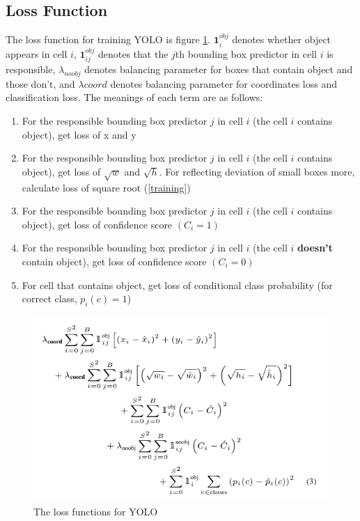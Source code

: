 \documentclass[extendedabs]{bmvc2k}
\begin{document}
\subsection{Loss Function}
The loss function for training YOLO is figure \ref{lossfunction}. $\mathbf{1}^{obj}_i$ denotes whether object appears in cell $i$, $\mathbf{1}^{obj}_{ij}$ denotes that the $j$th bounding box predictor in cell $i$ is responsible, $\lambda_{noobj} $ denotes balancing parameter for boxes that contain object and those don't, and $\lambda{coord}$ denotes balancing parameter for coordinates loss and classification loss. The meanings of each term are as follows:
\begin{enumerate}
    \item For the responsible bounding box predictor $j$ in cell $i$ (the cell $i$ contains object), get loss of x and y
    \item For the responsible bounding box predictor $j$ in cell $i$ (the cell $i$ contains object), get loss of $\sqrt{w}$ and $\sqrt{h}$. For reflecting deviation of small boxes more, calculate loss of square root (\ref{training})
    \item For the responsible bounding box predictor $j$ in cell $i$ (the cell $i$ contains object), get loss of confidence score $(C_i=1)$
    \item For the responsible bounding box predictor $j$ in cell $i$ (the cell $i$ \textbf{doesn't} contain object), get loss of confidence score $(C_i=0)$
    \item For cell that contains object, get loss of conditional class probability (for correct class, $p_i(c)=1$)
\end{enumerate}

\begin{figure}[t]
	\includegraphics[width=\linewidth]{images/loss.PNG}
	\caption{
		The loss functions for YOLO}
	\vspace{-2mm}
 \label{lossfunction}
\end{figure}
\end{document}
